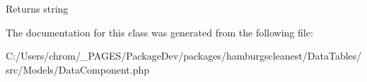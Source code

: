 \begin{DoxyReturn}{Returns}
string 
\end{DoxyReturn}


The documentation for this class was generated from the following file\+:\begin{DoxyCompactItemize}
\item 
C\+:/\+Users/chrom/\+\_\+\+P\+A\+G\+E\+S/\+Package\+Dev/packages/hamburgscleanest/\+Data\+Tables/src/\+Models/Data\+Component.\+php\end{DoxyCompactItemize}
